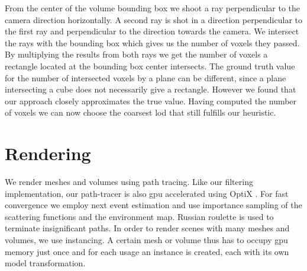 From the center of the volume bounding box we shoot a ray perpendicular to the camera direction horizontally.
A second ray is shot in a direction perpendicular to the first ray and perpendicular to the direction towards the camera.
We intersect the rays with the bounding box which gives us the number of voxels they passed.
By multiplying the results from both rays we get the number of voxels a rectangle located at the bounding box center intersects.
The ground truth value for the number of intersected voxels by a plane can be different, since a plane intersecting a cube does not necessarily give a rectangle.
However we found that our approach closely approximates the true value.
Having computed the number of voxels we can now choose the coarsest \ac{lod} that still fulfills our heuristic.

\section{Rendering}
\label{sec:rendering}
We render meshes and volumes using path tracing.
Like our filtering implementation, our path-tracer is also \ac{gpu} accelerated using OptiX \cite{parker_optix}.
For fast convergence we employ next event estimation and use importance sampling of the scattering functions and the environment map.
Russian roulette is used to terminate insignificant paths.
In order to render scenes with many meshes and volumes, we use instancing.
A certain mesh or volume thus has to occupy \ac{gpu} memory just once and for each usage an instance is created, each with its own model transformation.

